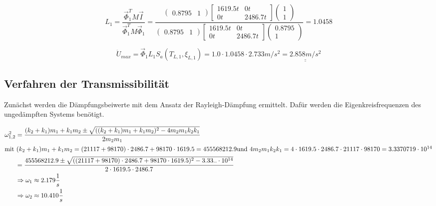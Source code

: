 \begin{equation*}
L_1 = \frac{\vec{\Phi}_1^T M \vec{I}}{\vec{\Phi}_1^T M \vec{\Phi}_1} = \frac{
\begin{pmatrix}
  0.8795 & 1
\end{pmatrix}
\begin{bmatrix}
  1619.5 t & 0 t\\
  0 t & 2486.7 t
\end{bmatrix}
\begin{pmatrix}
  1\\
  1
\end{pmatrix}
}{
\begin{pmatrix}
  0.8795 & 1
\end{pmatrix}
\begin{bmatrix}
  1619.5 t & 0 t\\
  0 t & 2486.7 t
\end{bmatrix}
\begin{pmatrix}
  0.8795 \\
  1
\end{pmatrix}}
= 1.0458
\end{equation*}

\begin{equation*}
\ddot U_{max} = \vec{\Phi}_1 L_1 S_a(T_{L,1}, \xi_{L,1}) = 1.0 \cdot 1.0458 \cdot 2.733 m/s^2 = \underline{\underline{2.858 m/s^2}}
\end{equation*}

\subsection{Verfahren der Transmissibilität}

Zunächst werden die Dämpfungsbeiwerte mit dem Ansatz der Rayleigh-Dämpfung ermittelt. Dafür werden die Eigenkreisfrequenzen des ungedämpften Systems benötigt.

\begin{align*}
\omega_{1,2}^2 &= \frac{(k_2 + k_1) m_1 + k_1 m_2 \pm \sqrt{((k_2 + k_1) m_1 + k_1 m_2)^2 - 4 m_2 m_1 k_2 k_1}}{2 m_2 m_1}\\
               \intertext{mit $(k_2 + k_1) m_1 + k_1 m_2 = (21117  + 98170 ) \cdot 2486.7  + 98170  \cdot 1619.5 = 455568212.9 $ \newline und $4 m_2 m_1 k_2 k_1 = 4 \cdot 1619.5  \cdot 2486.7  \cdot 21117  \cdot 98170 = 3.3370719 \cdot 10^{14}$}
               &= \frac{ 455568212.9 \pm \sqrt{((21117  + 98170 ) \cdot 2486.7  + 98170  \cdot 1619.5 )^2 - 3.33.. \cdot 10^{14}}}{2 \cdot 1619.5  \cdot 2486.7 }\\
               &\Rightarrow \omega_1 \approx 2.179 \frac{1}{s}\\
               &\Rightarrow \omega_2 \approx 10.410 \frac{1}{s}
\end{align*}

